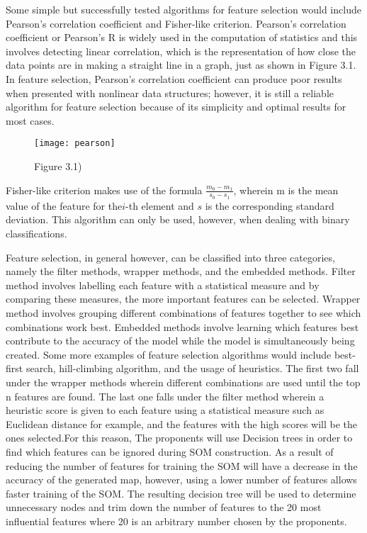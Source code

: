 	Some simple but successfully tested algorithms for feature selection would include Pearson’s correlation coefficient and Fisher-like criterion. Pearson’s correlation coefficient or Pearson’s R is widely used in the computation of statistics and this involves detecting linear correlation, which is the representation of how close the data points are in making a straight line in a graph, just as shown in Figure 3.1. In feature selection, Pearson’s correlation coefficient can produce poor results when presented with nonlinear data structures; however, it is still a reliable algorithm for feature selection because of its simplicity and optimal results for most cases.

\begin{figure}[h]
\caption{Figure 3.1)}
\centering
\texttt{[image: pearson]}
\end{figure}

Fisher-like criterion makes use of the formula $\frac{m_0-m_1}{s_0-s_1}$, wherein m is the mean value of the feature for the$i$-th element and $s$ is the corresponding standard deviation. This algorithm can only be used, however, when dealing with binary classifications.

Feature selection, in general however, can be classified into three categories, namely the filter methods, wrapper methods, and the embedded methods. Filter method involves labelling each feature with a statistical measure and by comparing these measures, the more important features can be selected. Wrapper method involves grouping different combinations of features together to see which combinations work best. Embedded methods involve learning which features best contribute to the accuracy of the model while the model is simultaneously being created. Some more examples of feature selection algorithms would include best-first search, hill-climbing algorithm, and the usage of heuristics. The first two fall under the wrapper methods wherein different combinations are used until the top n features are found. The last one falls under the filter method wherein a heuristic score is given to each feature using a statistical measure such as Euclidean distance for example, and the features with the high scores will be the ones selected.For this reason, The proponents will use Decision trees in order to find which features can be ignored during SOM construction. As a result of reducing the number of features for training the SOM will have a decrease in the accuracy of the generated map, however, using a lower number of features allows faster training of the SOM. The resulting  decision tree will be used to determine unnecessary nodes and trim down the number of features to the 20 most influential features where 20 is an arbitrary number chosen by the proponents.

